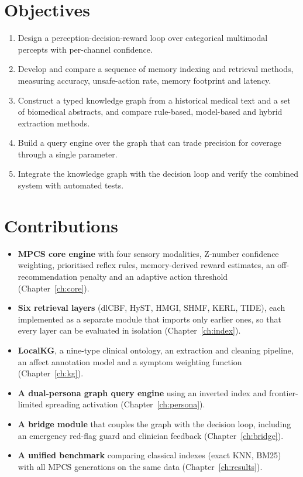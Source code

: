 \documentclass[12pt,a4paper,oneside]{report}
\begin{document}
\section{Objectives}
\begin{enumerate}
  \item Design a perception-decision-reward loop over categorical multimodal percepts with per-channel confidence.
  \item Develop and compare a sequence of memory indexing and retrieval methods, measuring accuracy, unsafe-action rate, memory footprint and latency.
  \item Construct a typed knowledge graph from a historical medical text and a set of biomedical abstracts, and compare rule-based, model-based and hybrid extraction methods.
  \item Build a query engine over the graph that can trade precision for coverage through a single parameter.
  \item Integrate the knowledge graph with the decision loop and verify the combined system with automated tests.
\end{enumerate}

\section{Contributions}
\begin{itemize}
  \item \textbf{MPCS core engine} with four sensory modalities, Z-number confidence weighting, prioritised reflex rules, memory-derived reward estimates, an off-recommendation penalty and an adaptive action threshold (Chapter~\ref{ch:core}).
  \item \textbf{Six retrieval layers} (dlCBF, HyST, HMGI, SHMF, KERL, TIDE), each implemented as a separate module that imports only earlier ones, so that every layer can be evaluated in isolation (Chapter~\ref{ch:index}).
  \item \textbf{LocalKG}, a nine-type clinical ontology, an extraction and cleaning pipeline, an affect annotation model and a symptom weighting function (Chapter~\ref{ch:kg}).
  \item \textbf{A dual-persona graph query engine} using an inverted index and frontier-limited spreading activation (Chapter~\ref{ch:persona}).
  \item \textbf{A bridge module} that couples the graph with the decision loop, including an emergency red-flag guard and clinician feedback (Chapter~\ref{ch:bridge}).
  \item \textbf{A unified benchmark} comparing classical indexes (exact KNN, BM25) with all MPCS generations on the same data (Chapter~\ref{ch:results}).
\end{itemize}
\end{document}
